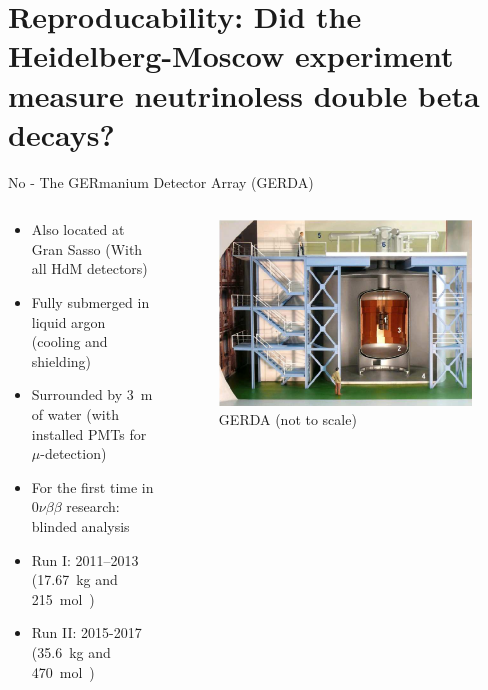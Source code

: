 \section{Reproducability: Did the Heidelberg-Moscow experiment measure neutrinoless double beta decays?}
\begin{frame}{No - The GERmanium Detector Array (GERDA)}
	\begin{columns}
		\begin{column}{.7\textwidth}
			\begin{itemize}
				\item Also located at Gran Sasso (With all HdM detectors)
				\item Fully submerged in liquid argon (cooling and shielding)
				\item Surrounded by \SI{3}{\meter} of water (with installed PMTs for $\mu$-detection)
				\item For the first time in $0\nu\beta\beta$ research: blinded analysis
				\item Run I: 2011--2013 (\SI{17.67}{\kilo\gram} and \SI{215}{\mole\year}) 
				\item Run II: 2015-2017 (\SI{35.6}{\kilo\gram} and \SI{470}{\mole\year})
			\end{itemize}
		\end{column}
		\begin{column}{.29\textwidth}
			\begin{figure}
				\centering
				\includegraphics[trim=230 0 0 0,clip,width=\textwidth]{media/GERDA.png}
				\caption*{\hspace{-25em}GERDA (not to scale) \footnotemark[1]}
			\end{figure}
		\end{column}
	\end{columns}
\end{frame}
